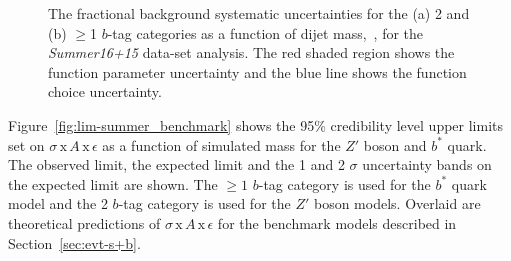 \begin{figure}[!ht]
  \begin{center}
    \captionsetup[subfigure]{aboveskip=0pt,justification=centering}
  \end{center}
  \vspace{-1mm}
  \caption[The background systematic uncertainties as a function of dijet mass
    in the \textit{Summer16+15} data-set analysis.]
          {The fractional background systematic uncertainties for the (a) 2 and (b) $\geq$1 $b$-tag categories
            as a function of dijet mass,~\mjj, for the \textit{Summer16+15} data-set analysis.
            The red shaded region shows the function parameter uncertainty and
            the blue line shows the function choice uncertainty.  }
          \label{fig:lim-summer_systBkg}
\end{figure}

Figure~\ref{fig:lim-summer_benchmark} shows the
95\% credibility level upper limits set on $\sigma\,\text{x}\,\mathit{A}\,\text{x}\,\epsilon$
as a function of simulated mass
for the $Z'$ boson and $b^*$ quark.
The observed limit, the expected limit and the 1 and 2 $\sigma$ uncertainty bands on the expected limit are shown.
The $\geq1$ $b$-tag category is used for the $b^*$ quark model
and the 2 $b$-tag category is used for the $Z'$ boson models.
Overlaid are theoretical predictions of
$\sigma\,\text{x}\,\mathit{A}\,\text{x}\,\epsilon$ for the benchmark models described in Section~\ref{sec:evt-s+b}.

